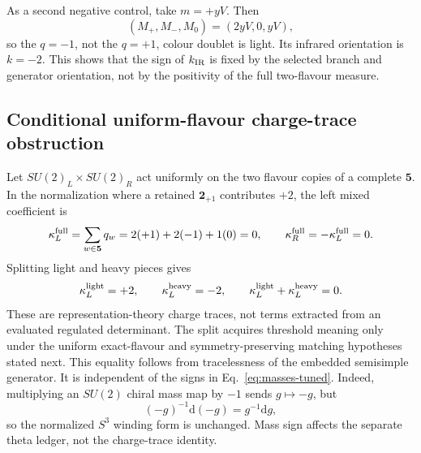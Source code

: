 \documentclass[11pt]{article}
\theoremstyle{definition}
\theoremstyle{remark}
\newcommand{\dd}{\mathrm d}
\begin{document}
As a second negative control, take \(m=+yV\).  Then
\begin{equation}
 (M_+,M_-,M_0)=(2yV,0,yV),
 \label{eq:opposite-tuning}
\end{equation}
so the \(q=-1\), not the \(q=+1\), colour doublet is light.  Its infrared
orientation is \(k=-2\).  This shows that the sign of \(k_{\rm IR}\) is
fixed by the selected branch and generator orientation, not by the
positivity of the full two-flavour measure.

\subsection{Conditional uniform-flavour charge-trace obstruction}

Let \(SU(2)_L\times SU(2)_R\) act uniformly on the two flavour copies of a
complete \(\bm5\).  In the normalization where a retained
\(\bm2_{+1}\) contributes \(+2\), the left mixed coefficient is
\begin{equation}
 \kappa_L^{\rm full}
 =\sum_{w\in\bm5}q_w
 =2(+1)+2(-1)+1(0)=0,
 \qquad \kappa_R^{\rm full}=-\kappa_L^{\rm full}=0.
 \label{eq:full-trace}
\end{equation}
Splitting light and heavy pieces gives
\begin{equation}
 \kappa_L^{\rm light}=+2,
 \qquad
 \kappa_L^{\rm heavy}=-2,
 \qquad
 \kappa_L^{\rm light}+\kappa_L^{\rm heavy}=0.
 \label{eq:threshold-cancel}
\end{equation}
These are representation-theory charge traces, not terms extracted from an
evaluated regulated determinant.  The split acquires threshold meaning only
under the uniform exact-flavour and symmetry-preserving matching hypotheses
stated next.
This equality follows from tracelessness of the embedded semisimple
generator.  It is independent of the signs in
Eq.~\eqref{eq:masses-tuned}.  Indeed, multiplying an \(SU(2)\) chiral mass
map by \(-1\) sends \(g\mapsto-g\), but
\begin{equation}
 (-g)^{-1}\dd(-g)=g^{-1}\dd g,
 \label{eq:minus-g}
\end{equation}
so the normalized \(S^3\) winding form is unchanged.  Mass sign affects
the separate theta ledger, not the charge-trace identity.
\end{document}
